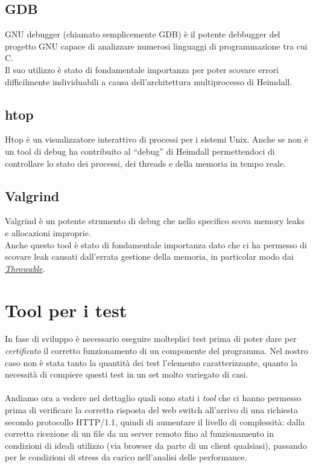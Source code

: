 \documentclass[italian]{tktltiki2}
\begin{document}
\subsection{GDB}
GNU debugger (chiamato semplicemente GDB)\cite{gdb} è il potente debbugger del progetto GNU capace di analizzare numerosi linguaggi di programmazione tra cui C.
\\
Il suo utilizzo è stato di fondamentale importanza per poter scovare errori difficilmente individuabili a causa dell'architettura multiprocesso di Heimdall.

\subsection{htop}
Htop\cite{htop} è un visualizzatore interattivo di processi per i sistemi Unix. Anche se non è un tool di debug ha contribuito al ``debug'' di Heimdall permettendoci di controllare lo stato dei processi, dei threads e della memoria in tempo reale.

\subsection{Valgrind}
Valgrind\cite{valgrind} è un potente strumento di debug che nello specifico scova memory leaks e allocazioni improprie.
\\
Anche questo tool è stato di fondamentale importanza dato che ci ha permesso di scovare leak causati dall'errata gestione della memoria, in particolar modo dai \hyperref[sec:errors]{\emph{Throwable}}.

\newpage
\section{Tool per i test}
In fase di sviluppo è necessario eseguire molteplici test prima di poter dare per \emph{certificato} il corretto funzionamento di un componente del programma. Nel nostro caso non è stata tanto la quantità dei test l'elemento caratterizzante, quanto la necessità di compiere questi test in un set molto variegato di casi. \\\\
Andiamo ora a vedere nel dettaglio quali sono stati i \emph{tool} che ci hanno permesso prima di verificare la corretta risposta del web switch all'arrivo di una richiesta secondo protocollo HTTP/1.1, quindi di aumentare il livello di complessità: dalla corretta ricezione di un file da un server remoto fino al funzionamento in condizioni di ideali utilizzo (via browser da parte di un client qualsiasi), passando per le condizioni di stress da carico nell'analisi delle performance.
\end{document}
